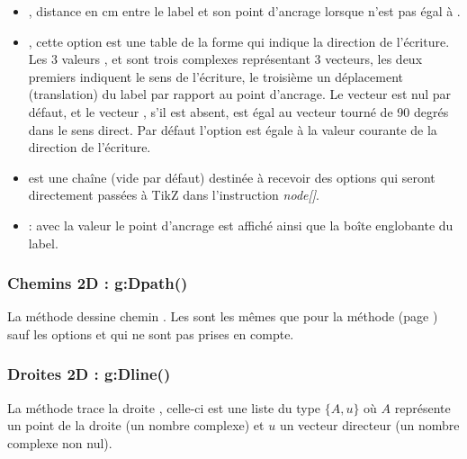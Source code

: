 \begin{itemize}
\begin{itemize}
            \item {}, distance en cm entre le label et son point d'ancrage lorsque  n'est pas égal à .
            
            \item {}, cette option est une table de la forme  qui indique la direction de l'écriture. Les 3 valeurs ,  et  sont trois complexes représentant 3 vecteurs, les deux premiers indiquent le sens de l'écriture, le troisième un déplacement (translation) du label par rapport au point d'ancrage. Le vecteur  est nul par défaut, et le vecteur , s'il est absent, est égal au vecteur  tourné de 90 degrés dans le sens direct.
            Par défaut l'option  est égale à la valeur courante de la direction de l'écriture.
            
            \item {} est une chaîne (vide par défaut) destinée à recevoir des options qui seront directement passées à TikZ dans l'instruction \emph{node[]}.
            
            \item {} : avec la valeur \true le point d'ancrage est affiché ainsi que la boîte englobante du label.
        \end{itemize}
\end{itemize}

\subsubsection{Chemins 2D : g:Dpath()}

La méthode  dessine chemin . Les  sont les mêmes que pour la méthode  (page \pageref{dec:dpolyline}) sauf les options  et  qui ne sont pas prises en compte.

\subsubsection{Droites 2D : g:Dline()}

La méthode  trace la droite , celle-ci est une liste du type $\{A,u\}$ où $A$ représente un point de la droite (un nombre complexe) et $u$ un vecteur directeur (un nombre complexe non nul). 


